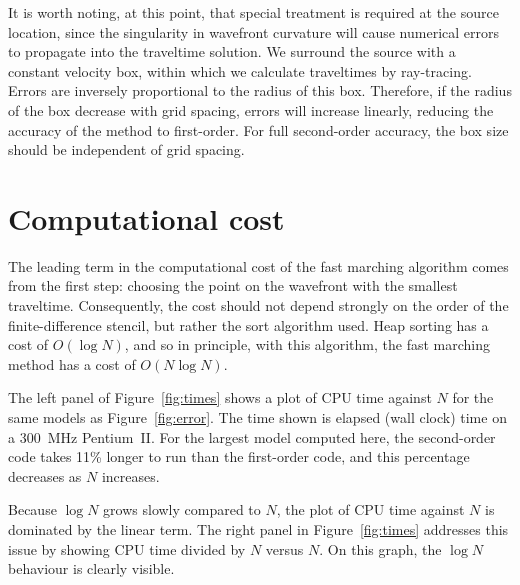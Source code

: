 \par
It is worth noting, at this point, that special treatment is required 
at the source location, since the singularity in wavefront curvature
will cause numerical errors to propagate into the traveltime
solution.  We surround the source with a constant
velocity box, within which we calculate traveltimes by ray-tracing.
Errors are inversely proportional to the radius of this
box. Therefore, if the radius of the box decrease with grid spacing, 
errors will increase linearly, 
reducing the accuracy of the method to first-order. 
For full second-order accuracy, the box size should be independent of
grid spacing.



\section{Computational cost}


The leading term in the computational cost of the fast marching
algorithm comes from the first step: 
choosing the point on the wavefront with the smallest traveltime. 
Consequently, the cost should not depend strongly on the order of the 
finite-difference stencil, but rather the sort algorithm used. 
Heap sorting has a cost of $O(\log N)$, and so in principle, with this 
algorithm, the fast marching method has a cost of $O( N \log N)$.

\par
The left panel of Figure~\ref{fig:times} shows a plot of CPU time
against $N$ for the same models as Figure~\ref{fig:error}. 
The time shown is elapsed (wall clock) time on a 300~MHz Pentium~II.  
For the largest model computed here, the second-order code takes 11\%
longer to run than the first-order code, and this percentage decreases
as $N$ increases. 

\par
Because $\log N$ grows slowly compared to $N$, the plot of CPU time
against $N$ is dominated by the linear term.  The right panel in
Figure~\ref{fig:times} addresses this issue by showing CPU time
divided by $N$ versus $N$.  On this graph, the $\log N$ behaviour is
clearly visible.

